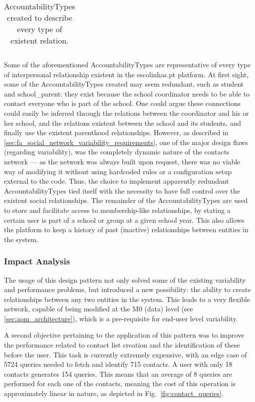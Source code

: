 \begin{center}
\begin{small}
\begin{longtable}{|l|l|l|l|p{5cm}|}
    \caption{AccountabilityTypes created to describe every type of existent relation.}
    \label{table:accountability_types}
    \end{longtable}
  \end{small}
\end{center}

Some of the aforementioned AccountabilityTypes are representative of every type of interpersonal relationship existent in the escolinhas.pt platform. At first sight, some of the AccountabilityTypes created may seem redundant, such as student and school\_parent: they exist because the school coordinator needs to be able to contact everyone who is part of the school. One could argue these connections could easily be inferred through the relations between the coordinator and his or her school, and the relations existent between the school and its students, and finally use the existent parenthood relationships. However, as described in \ref{sec:fa_social_network_variability_requirements}, one of the major design flaws (regarding variability), was the completely dynamic nature of the contacts network --- as the network was always built upon request, there was no viable way of modifying it without using hardcoded rules or a configuration setup external to the code. Thus, the choice to implement apparently redundant AccountabilityTypes tied itself with the necessity to have full control over the existent social relationships. The remainder of the AccountabilityTypes are used to store and facilitate access to membership-like relationships, by stating a certain user is part of a school or group at a given school year. This also allows the platform to keep a history of past (inactive) relationships between entities in the system.

\subsubsection{Impact Analysis}\label{sec:fa_social_network_impact_analysis}

The usage of this design pattern not only solved some of the existing variability and performance problems, but introduced a new possibility: the ability to create relationships between any two entities in the system. This leads to a very flexible network, capable of being modified at the M0 (data) level (see \ref{sec:aom_architecture}), which is a pre-requisite for end-user level variability.

A second objective pertaining to the application of this pattern was to improve the performance related to contact list creation and the identification of these before the user. This task is currently extremely expensive, with an edge case of 5724 queries needed to fetch and identify 715 contacts. A user with only 18 contacts generates 154 queries. This means that an average of 8 queries are performed for each one of the contacts, meaning the cost of this operation is approximately linear in nature, as depicted in Fig.~\ref{fig:contact_queries}.


